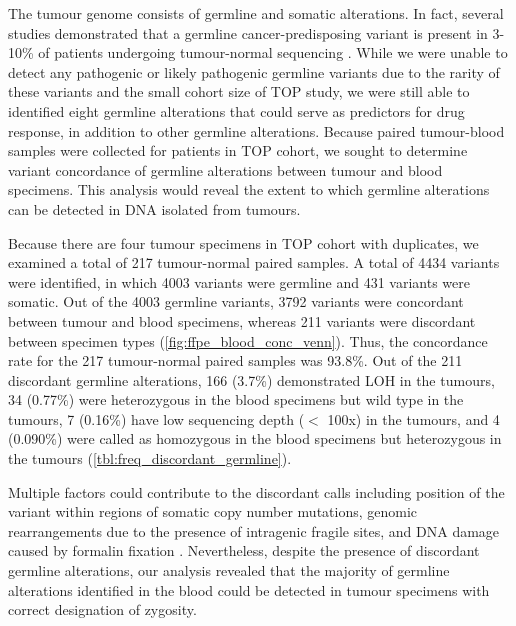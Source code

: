 The tumour genome consists of germline and somatic alterations. In fact, several studies demonstrated that a germline cancer-predisposing variant is present in 3-10\% of patients undergoing tumour-normal sequencing \cite{Raymond2016, Meric-Bernstam2016, Schrader2015, Jones2015a}. While we were unable to detect any pathogenic or likely pathogenic germline variants due to the rarity of these variants and the small cohort size of TOP study, we were still able to identified eight germline alterations that could serve as predictors for drug response, in addition to other germline alterations. Because paired tumour-blood samples were collected for patients in TOP cohort, we sought to determine variant concordance of germline alterations between tumour and blood specimens. This analysis would reveal the extent to which germline alterations can be detected in DNA isolated from tumours.

Because there are four tumour specimens in TOP cohort with duplicates, we examined a total of 217 tumour-normal paired samples. A total of 4434 variants were identified, in which 4003 variants were germline and 431 variants were somatic. Out of the 4003 germline variants, 3792 variants were concordant between tumour and blood specimens, whereas 211 variants were discordant between specimen types (\autoref{fig:ffpe_blood_conc_venn}). Thus, the concordance rate for the 217 tumour-normal paired samples was 93.8\%. Out of the 211 discordant germline alterations, 166 (3.7\%) demonstrated LOH in the tumours, 34 (0.77\%) were heterozygous in the blood specimens but wild type in the tumours, 7 (0.16\%) have low sequencing depth ($<$ 100x) in the tumours, and 4 (0.090\%) were called as homozygous in the blood specimens but heterozygous in the tumours (\autoref{tbl:freq_discordant_germline}).

Multiple factors could contribute to the discordant calls including position of the variant within regions of somatic copy number mutations, genomic rearrangements due to the presence of intragenic fragile sites, and DNA damage caused by formalin fixation \cite{Gross2013, Arlt2004}. Nevertheless, despite the presence of discordant germline alterations, our analysis revealed that the majority of germline alterations identified in the blood could be detected in tumour specimens with correct designation of zygosity.



